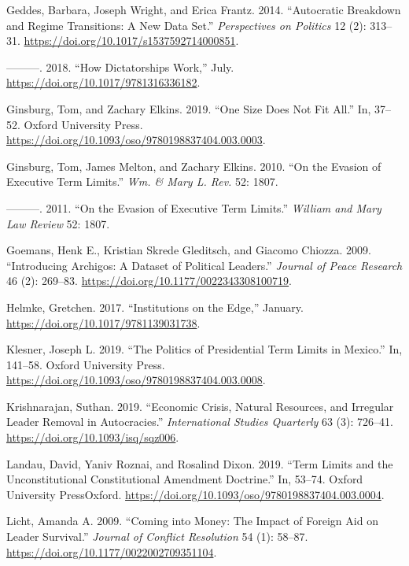 \documentclass[
  12pt,
]{report}
\newlength{\cslhangindent}
\newenvironment{CSLReferences}[2] %
 {\begin{list}{}{%
  \setlength{\itemindent}{0pt}
  \setlength{\leftmargin}{0pt}
  \setlength{\parsep}{0pt}
  \ifodd #1
   \setlength{\leftmargin}{\cslhangindent}
   \setlength{\itemindent}{-1\cslhangindent}
  \fi
  \setlength{\itemsep}{#2\baselineskip}}}
 {\end{list}}
\begin{document}
\begin{CSLReferences}{1}{0}
Geddes, Barbara, Joseph Wright, and Erica Frantz. 2014. {``Autocratic
Breakdown and Regime Transitions: A New Data Set.''} \emph{Perspectives
on Politics} 12 (2): 313--31.
\url{https://doi.org/10.1017/s1537592714000851}.

---------. 2018. {``How Dictatorships Work,''} July.
\url{https://doi.org/10.1017/9781316336182}.

Ginsburg, Tom, and Zachary Elkins. 2019. {``One Size Does Not Fit
All.''} In, 37--52. Oxford University Press.
\url{https://doi.org/10.1093/oso/9780198837404.003.0003}.

Ginsburg, Tom, James Melton, and Zachary Elkins. 2010. {``On the Evasion
of Executive Term Limits.''} \emph{Wm. \& Mary L. Rev.} 52: 1807.

---------. 2011. {``On the Evasion of Executive Term Limits.''}
\emph{William and Mary Law Review} 52: 1807.

Goemans, Henk E., Kristian Skrede Gleditsch, and Giacomo Chiozza. 2009.
{``Introducing Archigos: A Dataset of Political Leaders.''}
\emph{Journal of Peace Research} 46 (2): 269--83.
\url{https://doi.org/10.1177/0022343308100719}.

Helmke, Gretchen. 2017. {``Institutions on the Edge,''} January.
\url{https://doi.org/10.1017/9781139031738}.

Klesner, Joseph L. 2019. {``The Politics of Presidential Term Limits in
Mexico.''} In, 141--58. Oxford University Press.
\url{https://doi.org/10.1093/oso/9780198837404.003.0008}.

Krishnarajan, Suthan. 2019. {``Economic Crisis, Natural Resources, and
Irregular Leader Removal in Autocracies.''} \emph{International Studies
Quarterly} 63 (3): 726--41. \url{https://doi.org/10.1093/isq/sqz006}.

Landau, David, Yaniv Roznai, and Rosalind Dixon. 2019. {``Term Limits
and the Unconstitutional Constitutional Amendment Doctrine.''} In,
53--74. Oxford University PressOxford.
\url{https://doi.org/10.1093/oso/9780198837404.003.0004}.

Licht, Amanda A. 2009. {``Coming into Money: The Impact of Foreign Aid
on Leader Survival.''} \emph{Journal of Conflict Resolution} 54 (1):
58--87. \url{https://doi.org/10.1177/0022002709351104}.


\end{CSLReferences}
\end{document}
